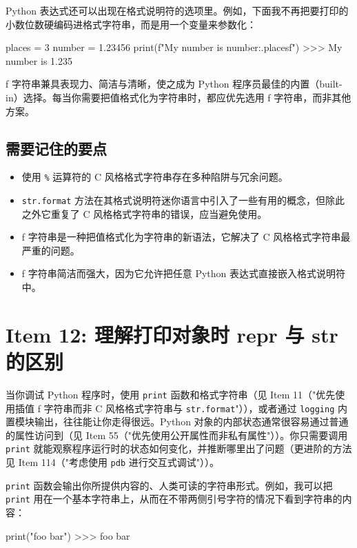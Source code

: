 Python 表达式还可以出现在格式说明符的选项里。例如，下面我不再把要打印的小数位数硬编码进格式字符串，而是用一个变量来参数化：

\begin{codebox}[python]
places = 3
number = 1.23456
print(f"My number is {number:.{places}f}")
>>>
My number is 1.235
\end{codebox}

f 字符串兼具表现力、简洁与清晰，使之成为 Python 程序员最佳的内置（built-in）选择。每当你需要把值格式化为字符串时，都应优先选用 f 字符串，而非其他方案。

\subsection{需要记住的要点}

\begin{itemize}
\item 使用 \texttt{\%} 运算符的 C 风格格式字符串存在多种陷阱与冗余问题。
\item \texttt{str.format} 方法在其格式说明符迷你语言中引入了一些有用的概念，但除此之外它重复了 C 风格格式字符串的错误，应当避免使用。
\item f 字符串是一种把值格式化为字符串的新语法，它解决了 C 风格格式字符串最严重的问题。
\item f 字符串简洁而强大，因为它允许把任意 Python 表达式直接嵌入格式说明符中。
\end{itemize}

\section{Item 12: 理解打印对象时 repr 与 str 的区别}

当你调试 Python 程序时，使用 \texttt{print} 函数和格式字符串（见 Item 11（"优先使用插值 f 字符串而非 C 风格格式字符串与 \texttt{str.format}"）），或者通过 \texttt{logging} 内置模块输出，往往能让你走得很远。Python 对象的内部状态通常很容易通过普通的属性访问到（见 Item 55（"优先使用公开属性而非私有属性"））。你只需要调用 \texttt{print} 就能观察程序运行时的状态如何变化，并推断哪里出了问题（更进阶的方法见 Item 114（"考虑使用 \texttt{pdb} 进行交互式调试"））。

\texttt{print} 函数会输出你所提供内容的、人类可读的字符串形式。例如，我可以把 \texttt{print} 用在一个基本字符串上，从而在不带两侧引号字符的情况下看到字符串的内容：

\begin{codebox}[python]
print("foo bar")
>>>
foo bar
\end{codebox}

